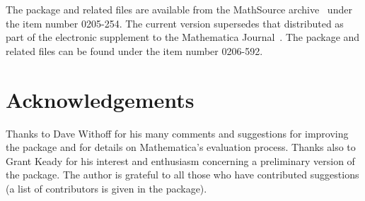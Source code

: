 \documentclass [12pt,twoside]{article}
\begin{document}
The package  and related files are available from the MathSource
archive~\cite{mathsource} under the item number 0205-254. The current version supersedes
that distributed as part of the electronic supplement to the Mathematica
Journal~\cite{me93a}. The package  and related files can be found
under the item number 0206-592.

\pagebreak[2]

\section*{Acknowledgements}
Thanks to Dave Withoff for his many comments and suggestions for improving the
package and for details on Mathematica's evaluation process. Thanks also to Grant
Keady for his interest and enthusiasm concerning a preliminary version of the
package. The author is grateful to all those who have contributed suggestions (a
list of contributors is given in the package).

\pagebreak[2]
\end{document}
